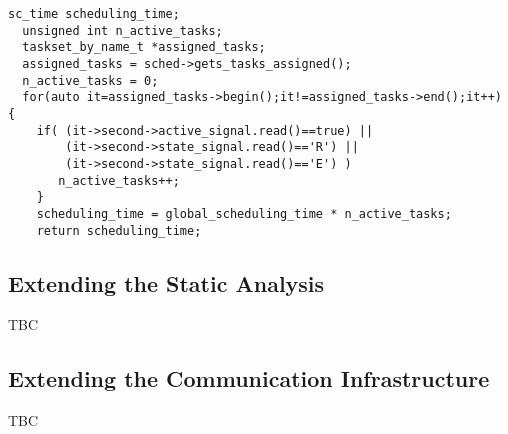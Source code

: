 \begin{lstlisting}[style=KistaCodeStyle,caption={API to provide scheduling time calculators.},label=list:sched_time_proportional_to_ready_tasks]
  sc_time scheduling_time;
  unsigned int n_active_tasks;
  taskset_by_name_t *assigned_tasks;
  assigned_tasks = sched->gets_tasks_assigned();
  n_active_tasks = 0;
  for(auto it=assigned_tasks->begin();it!=assigned_tasks->end();it++) {
    if( (it->second->active_signal.read()==true) || 
        (it->second->state_signal.read()=='R') ||
        (it->second->state_signal.read()=='E') )
  	   n_active_tasks++;
	}
	scheduling_time = global_scheduling_time * n_active_tasks;
	return scheduling_time;
\end{lstlisting}

\subsection{Extending the Static Analysis}
\label{sec:ext_stat_anal}
TBC

\subsection{Extending the Communication Infrastructure}
\label{sec:ext_comm}
TBC
